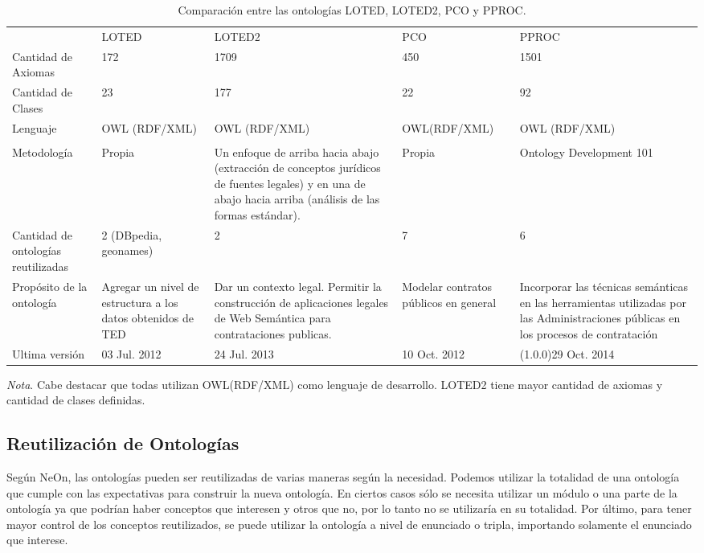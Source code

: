 \begin{table}[!htpb]
    \caption{Comparación entre las ontologías LOTED, LOTED2, PCO y PPROC.}
    \label{tab:comparacion_ontologias}
    
    \scriptsize 
    \begin{tabular}{L{2cm}C{3cm}C{3cm}C{2.5cm}C{3cm}}
    
     & LOTED & LOTED2 & PCO & PPROC \\
    
    
    Cantidad de Axiomas & 172 & 1709 & 450 & 1501 \\
    Cantidad de Clases & 23 & 177 & 22 & 92\\
    Lenguaje & OWL (RDF/XML) & OWL (RDF/XML) & OWL(RDF/XML) & OWL (RDF/XML)\\\\
    Metodología & Propia & 
    Un enfoque de arriba hacia abajo (extracción de conceptos jurídicos de fuentes legales) y en una de abajo hacia arriba (análisis de las formas estándar).
     & Propia & Ontology Development 101\\
    Cantidad de ontologías reutilizadas & 2 (DBpedia, geonames) & 2 & 7 & 6\\
    Propósito de la ontología & Agregar un nivel de estructura a los datos obtenidos de TED & Dar un contexto legal. Permitir la construcción de aplicaciones legales de Web Semántica para contrataciones publicas. & Modelar contratos públicos en general & Incorporar las técnicas
    semánticas en las herramientas utilizadas por las Administraciones públicas en los procesos de contratación\\
    Ultima versión & 03 Jul. 2012 & 24 Jul. 2013 & 10 Oct. 2012 & (1.0.0)29 Oct. 2014\\
    
    
    \end{tabular}
    
    \bigskip
    \small\textit{Nota}. Cabe destacar que todas utilizan OWL(RDF/XML) como lenguaje de desarrollo. LOTED2 tiene mayor cantidad de axiomas y cantidad de clases definidas.
    \end{table}

    \subsection{Reutilización de Ontologías}


    Según NeOn, las ontologías pueden ser reutilizadas de varias maneras según la necesidad. 
Podemos utilizar la totalidad de una ontología que cumple con las expectativas para construir la nueva ontología. En ciertos casos sólo se necesita utilizar un módulo o una parte de la ontología ya que podrían haber conceptos que interesen y otros que no, por lo tanto no se utilizaría en su totalidad. Por último, para tener mayor control de los conceptos reutilizados, se puede utilizar la ontología a nivel de enunciado o tripla, importando solamente el enunciado que interese. 

